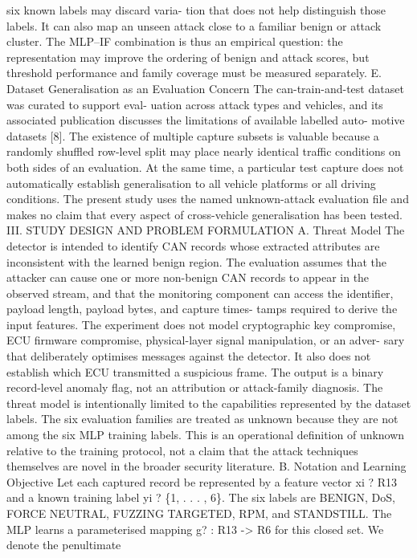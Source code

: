 \documentclass[
]{article}
\begin{document}
six known labels may discard varia- tion that does not help distinguish
those labels. It can also map an unseen attack close to a familiar
benign or attack cluster. The MLP--IF combination is thus an empirical
question: the representation may improve the ordering of benign and
attack scores, but threshold performance and family coverage must be
measured separately. E. Dataset Generalisation as an Evaluation Concern
The can-train-and-test dataset was curated to support eval- uation
across attack types and vehicles, and its associated publication
discusses the limitations of available labelled auto- motive datasets
{[}8{]}. The existence of multiple capture subsets is valuable because a
randomly shuffled row-level split may place nearly identical traffic
conditions on both sides of an evaluation. At the same time, a
particular test capture does not automatically establish generalisation
to all vehicle platforms or all driving conditions. The present study
uses the named unknown-attack evaluation file and makes no claim that
every aspect of cross-vehicle generalisation has been tested. III. STUDY
DESIGN AND PROBLEM FORMULATION A. Threat Model The detector is intended
to identify CAN records whose extracted attributes are inconsistent with
the learned benign region. The evaluation assumes that the attacker can
cause one or more non-benign CAN records to appear in the observed
stream, and that the monitoring component can access the identifier,
payload length, payload bytes, and capture times- tamps required to
derive the input features. The experiment does not model cryptographic
key compromise, ECU firmware compromise, physical-layer signal
manipulation, or an adver- sary that deliberately optimises messages
against the detector. It also does not establish which ECU transmitted a
suspicious frame. The output is a binary record-level anomaly flag, not
an attribution or attack-family diagnosis. The threat model is
intentionally limited to the capabilities represented by the dataset
labels. The six evaluation families are treated as unknown because they
are not among the six MLP training labels. This is an operational
definition of unknown relative to the training protocol, not a claim
that the attack techniques themselves are novel in the broader security
literature. B. Notation and Learning Objective Let each captured record
be represented by a feature vector xi ? R13 and a known training label
yi ? \{1, . . . , 6\}. The six labels are BENIGN, DoS, FORCE NEUTRAL,
FUZZING TARGETED, RPM, and STANDSTILL. The MLP learns a parameterised
mapping g? : R13 -> R6 for this closed set. We denote the penultimate
\end{document}
